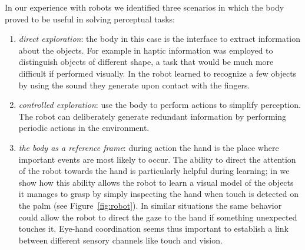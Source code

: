 In our experience with robots we identified three scenarios in which
the body proved to be useful in solving perceptual tasks:

\begin{enumerate}

\item {\em direct exploration}: the body in this case is the interface to
   extract information about the objects. For example in
   \cite{natale04learning} haptic information was employed to
   distinguish objects of different shape, a task that would be much
   more difficult if performed visually. In
   \cite{torres-jara05tapping} the robot learned to recognize a few
   objects by using the sound they generate upon contact with the
   fingers.

\item {\em controlled exploration}: use the body to perform actions to simplify
   perception. The robot can deliberately generate redundant
   information by performing periodic actions in the environment.

\item {\em the body as a reference frame}: during action the hand is the place
   where important events are most likely to occur. The ability to
   direct the attention of the robot towards the hand is particularly
   helpful during learning; in \cite{natale05exploring} we show how
   this ability allows the robot to learn a visual model of the
   objects it manages to grasp by simply inspecting the hand when
   touch is detected on the palm (see Figure~\ref{fig:robot}). In
   similar situations the same behavior could allow the robot to
   direct the gaze to the hand if something unexpected touches
   it. Eye-hand coordination seems thus important to establish a link
   between different sensory channels like touch and vision.

\end{enumerate}




